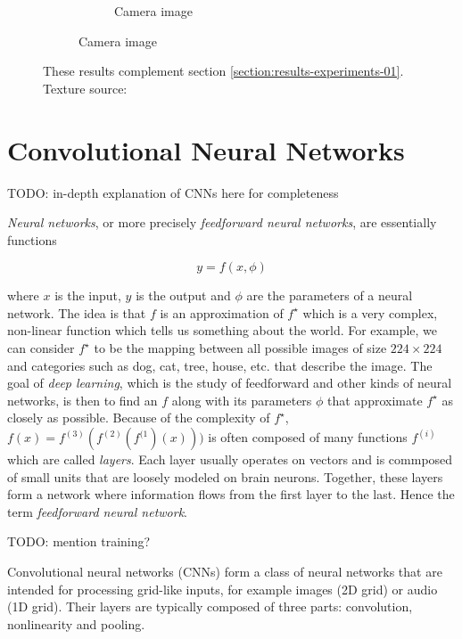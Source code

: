 \begin{figure}[]
\begin{subfigure}{\textwidth}
\begin{subfigure}{0.24\textwidth}
            \caption*{Camera image}
        \end{subfigure}
    \end{subfigure}
    \caption{These results complement section \ref{section:results-experiments-01}. Texture source: \citet{Gatys2015}}
    \label{fig:ex01-complete-flowers-1000steps}
\end{figure}

\chapter{Convolutional Neural Networks}
\label{chapter:appendix-cnns}

{\color{red} TODO: in-depth explanation of CNNs here for completeness}

\textit{Neural networks}, or more precisely \textit{feedforward neural networks}, are essentially functions

\begin{equation}
    \label{eq:neural_network}
    y = f(x, \phi)
\end{equation}

where \(x\) is the input, \(y\) is the output and \(\phi\) are the parameters of a neural network. The idea is that \(f\) is an approximation of \(f^\star\) which is a very complex, non-linear function which tells us something about the world. For example, we can consider \(f^\star\) to be the mapping between all possible images of size \(224 \times 224\) and categories such as dog, cat, tree, house, etc. that describe the image. The goal of \textit{deep learning}, which is the study of feedforward and other kinds of neural networks, is then to find an \(f\) along with its parameters \(\phi\) that approximate \(f^\star\) as closely as possible. Because of the complexity of \(f^\star\), \(f(x) = f^{(3)}(f^{(2)}(f^{(1})(x)))\) is often composed of many functions \(f^{(i)}\) which are called \textit{layers}. Each layer usually operates on vectors and is commposed of small units that are loosely modeled on brain neurons. Together, these layers form a network where information flows from the first layer to the last. Hence the term \textit{feedforward neural network}.

{\color{red} TODO: mention training?}

Convolutional neural networks (CNNs) form a class of neural networks that are intended for processing grid-like inputs, for example images (2D grid) or audio (1D grid). Their layers are typically composed of three parts: convolution, nonlinearity and pooling.

